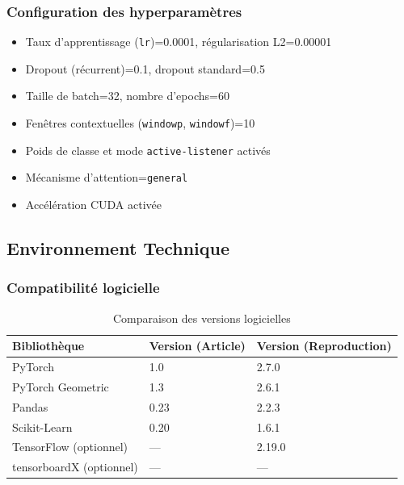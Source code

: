 \documentclass[a4paper,11pt]{article}
\begin{document}
\subsubsection{Configuration des hyperparamètres}
\begin{itemize}
  \item Taux d'apprentissage (\texttt{lr})=0.0001, régularisation L2=0.00001
  \item Dropout (récurrent)=0.1, dropout standard=0.5
  \item Taille de batch=32, nombre d'epochs=60
  \item Fenêtres contextuelles (\texttt{windowp}, \texttt{windowf})=10
  \item Poids de classe et mode \texttt{active-listener} activés
  \item Mécanisme d'attention=\texttt{general}
  \item Accélération CUDA activée
\end{itemize}

\subsection{Environnement Technique}

\subsubsection{Compatibilité logicielle}
\begin{table}[h]
  \centering
  \begin{tabular}{lll}
    \toprule
    \textbf{Bibliothèque} & \textbf{Version (Article)} & \textbf{Version (Reproduction)} \\
    \midrule
    PyTorch & 1.0 & 2.7.0 \\
    PyTorch Geometric & 1.3 & 2.6.1 \\
    Pandas & 0.23 & 2.2.3 \\
    Scikit-Learn & 0.20 & 1.6.1 \\
    TensorFlow (optionnel) & — & 2.19.0 \\
    tensorboardX (optionnel) & — & — \\
    \bottomrule
  \end{tabular}
  \caption{Comparaison des versions logicielles}
  \label{tab:env_versions}
\end{table}
\end{document}
